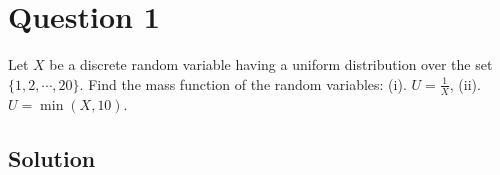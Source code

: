 \section*{Question 1}

Let \( X \) be a discrete random variable having a uniform distribution over the set \( \{1,2, \cdots, 20\} \).
Find the mass function of the random variables:
(i). \( U=\frac{1}{X} \),
(ii). \( U=\min (X, 10) \).

\subsection*{Solution}
